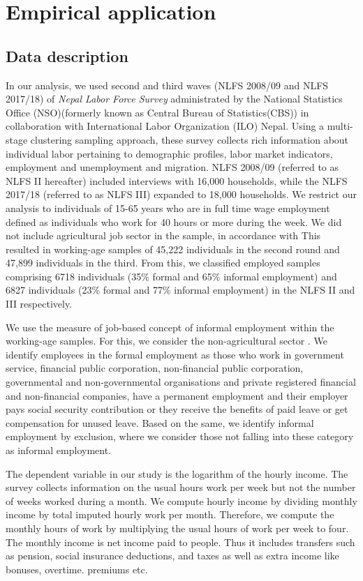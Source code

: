 \section{Empirical application}

\subsection{Data description}

In our analysis, we used second and third waves (NLFS 2008/09 and NLFS 2017/18) of \textit{Nepal Labor Force Survey} administrated by the National Statistics Office (NSO)(formerly known as Central Bureau of Statistics(CBS)) in collaboration with International Labor Organization (ILO) Nepal. Using a multi-stage clustering sampling approach, these survey collects rich information about individual labor pertaining to demographic profiles, labor market indicators, employment and unemployment and migration. NLFS 2008/09 (referred to as NLFS II hereafter) included interviews with 16,000 households, while the NLFS 2017/18 (referred to as NLFS III) expanded to 18,000 households. We restrict our analysis to individuals of 15-65 years who are in full time wage employment defined as individuals who work for 40 hours or more during the week. We did not include agricultural job sector in the sample, in accordance with This resulted in working-age samples of 45,222 individuals in the second round and 47,899 individuals in the third. From this, we classified employed samples comprising 6718 individuals (35\% formal and 65\% informal employment) and 6827 individuals (23\% formal and 77\% informal employment) in the NLFS II and III respectively. 

We use the measure of job-based concept of informal employment within the working-age samples. For this, we consider the non-agricultural sector . We identify employees in the formal employment as those who work in government service, financial public corporation, non-financial public corporation, governmental and non-governmental organisations and private registered financial and non-financial companies, have a permanent employment and their employer pays social security contribution or they receive the benefits of paid leave or get compensation for unused leave. Based on the same, we identify informal employment by exclusion, where we consider those not falling into these category as informal employment. 

The dependent variable in our study is the logarithm of the hourly income. The survey collects information on the usual hours work per week but not the number of weeks worked during a month. We compute hourly income by dividing monthly income by total imputed hourly work per month. Therefore, we compute the monthly hours of work by multiplying the usual hours of work per week to four. The monthly income is net income paid to people. Thus it includes transfers such as pension, social insurance deductions, and taxes as well as extra income like bonuses, overtime. premiums etc.


